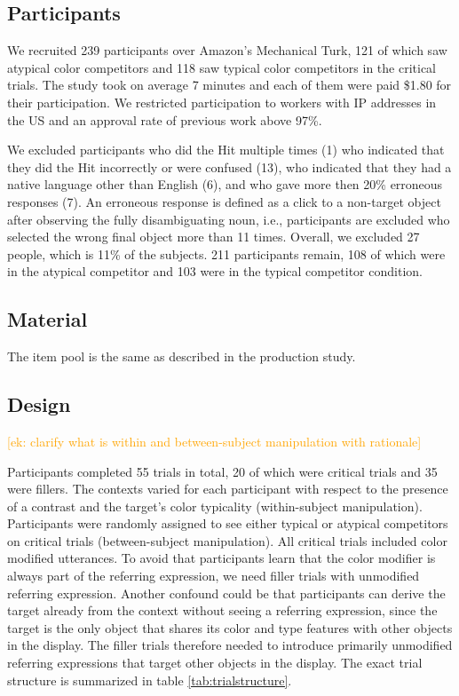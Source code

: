 \documentclass[10pt,letterpaper]{article}
\newcommand{\ek}[1]{\textcolor{Orange}{[ek: #1]}}
\begin{document}
\subsection{Participants}
We recruited 239 participants over Amazon's Mechanical Turk, 121 of which saw atypical color competitors and 118 saw typical color competitors in the critical trials. The study took on average 7 minutes and each of them were paid \$1.80 for their participation. We restricted participation to workers with IP addresses in the US and an approval rate of previous work above 97\%.

We excluded participants who did the Hit multiple times (1) who indicated that they did the Hit incorrectly or were confused (13), who indicated that they had a native language other than English (6), and who gave more then 20\% erroneous responses (7). An erroneous response is defined as a click to a non-target object after observing the fully disambiguating noun, i.e., participants are excluded who selected the wrong final object more than 11 times. Overall, we excluded 27 people, which is 11\% of the subjects. 211 participants remain, 108 of which were in the atypical competitor and 103 were in the typical competitor condition. 


\subsection{Material}
The item pool is the same as described in the production study.


\subsection{Design}
\ek{clarify what is within and between-subject manipulation with rationale}

Participants completed 55 trials in total, 20 of which were critical trials and 35 were fillers. The contexts varied for each participant with respect to the presence of a contrast and the target's color typicality (within-subject manipulation). Participants were randomly assigned to see either typical or atypical competitors on critical trials (between-subject manipulation). All critical trials included color modified utterances. To avoid that participants learn that the color modifier is always part of the referring expression, we need filler trials with unmodified referring expression. Another confound could be that participants can derive the target already from the context without seeing a referring expression, since the target is the only object that shares its color and type features with other objects in the display. The filler trials therefore needed to introduce primarily unmodified referring expressions that target other objects in the display. The exact trial structure is summarized in table \ref{tab:trialstructure}.
\end{document}
